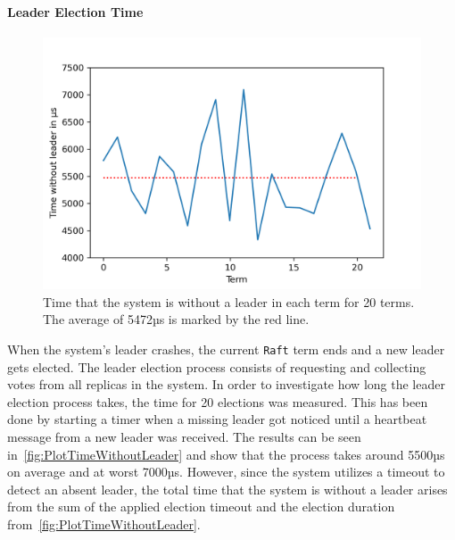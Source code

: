 \paragraph{Leader Election Time}
\begin{figure}[!hb]
	\centering
	\includegraphics[width=0.75\linewidth]{images/plots/timeWithoutLeader}
	\caption{Time that the system is without a leader in each term for 20 terms. The average of 5472µs is marked by the red line.}
	\label{fig:PlotTimeWithoutLeader}
\end{figure}

When the system's leader crashes, the current \texttt{Raft} term ends and a new leader gets elected.
The leader election process consists of requesting and collecting votes from all replicas in the system.
In order to investigate how long the leader election process takes, the time for 20 elections was measured.
This has been done by starting a timer when a missing leader got noticed until a heartbeat message from a new leader was received.
The results can be seen in~\autoref{fig:PlotTimeWithoutLeader} and show that the process takes around 5500µs on average and at worst 7000µs.
However, since the system utilizes a timeout to detect an absent leader, the total time that the system is without a leader arises from the sum of the applied election timeout and the election duration from~\autoref{fig:PlotTimeWithoutLeader}.

